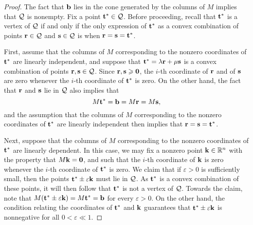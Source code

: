\documentclass[11pt]{amsart}
\begin{document}
\begin{proof}
   The fact that $\mathbf{b}$ lies in the cone generated by the columns of $M$ implies that $\mathcal{Q}$ is nonempty.
   Fix a point $\mathbf{t}^{\ast} \in \mathcal{Q}$.
   Before proceeding, recall that $\mathbf{t}^{\ast}$ is a vertex of $\mathcal{Q}$ if and only if the only expression of $\mathbf{t}^{\ast}$ as a convex combination of points $\mathbf{r} \in \mathcal{Q}$ and $\mathbf{s} \in \mathcal{Q}$ is when $\mathbf{r}=\mathbf{s}=\mathbf{t}^{\ast}$.

   First, assume that the columns of $M$ corresponding to the nonzero coordinates of $\mathbf{t}^{\ast}$ are linearly independent, and suppose that $\mathbf{t}^{\ast} = \lambda \mathbf{r} + \mu \mathbf{s}$ is a convex combination of points $\mathbf{r}, \mathbf{s} \in \mathcal{Q}$.
   Since $\mathbf{r},\mathbf{s}\geqslant \mathbf{0}$, the $i$-th coordinate of $\mathbf{r}$ and of $\mathbf{s}$ are zero whenever the $i$-th coordinate of $\mathbf{t}^{\ast}$ is zero.
   On the other hand, the fact that $\mathbf{r}$ and $\mathbf{s}$ lie in $\mathcal{Q}$ also implies that
   \[ M \mathbf{t}^{\ast} = \mathbf{b} = M \mathbf{r} = M \mathbf{s}, \]
   and the assumption that the columns of $M$ corresponding to the nonzero coordinates of $\mathbf{t}^{\ast}$ are linearly independent then implies that $\mathbf{r}=\mathbf{s}=\mathbf{t}^{\ast}$.

Next, suppose that the columns of $M$ corresponding to the nonzero coordinates of $\mathbf{t}^{\ast}$ are linearly dependent.   In this case, we may fix a nonzero point $\mathbf{k} \in \mathbb{R}^n$ with the property that $M \mathbf{k} = \mathbf{0}$, and such that the $i$-th coordinate of $\mathbf{k}$ is zero whenever the $i$-th coordinate of $\mathbf{t}^{\ast}$ is zero.  We claim that if $\varepsilon > 0$ is sufficiently small, then the points $\mathbf{t}^{\ast} \pm \varepsilon \mathbf{k}$ must lie in $\mathcal{Q}$.   As $\mathbf{t}^{\ast}$ is a convex combination of these points, it will then follow that $\mathbf{t}^{\ast}$ is not a vertex of $\mathcal{Q}$.  Towards the claim, note that $M(\mathbf{t}^{\ast} \pm \varepsilon \mathbf{k}) = M \mathbf{t}^{\ast} = \mathbf{b}$ for every $\varepsilon > 0$.  On the other hand, the condition relating the coordinates of $\mathbf{t}^{\ast}$ and $\mathbf{k}$ guarantees that $\mathbf{t}^{\ast} \pm \varepsilon \mathbf{k}$ is nonnegative for all $0 < \varepsilon \ll 1$.  
%
\end{proof}
\end{document}
